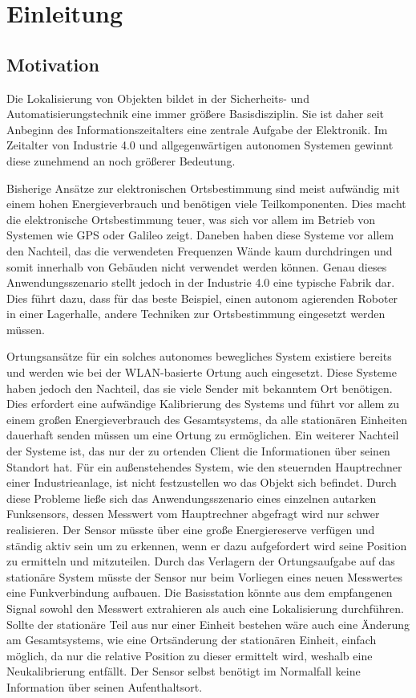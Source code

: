 
\chapter{Einleitung}
\label{sec:Einleitung}
\pagestyle{scrheadings}



\section{Motivation}
Die Lokalisierung von Objekten bildet in der Sicherheits- und Automatisierungstechnik eine immer größere Basisdisziplin. Sie ist daher seit Anbeginn des Informationszeitalters eine zentrale Aufgabe der Elektronik. Im Zeitalter von Industrie 4.0 und allgegenwärtigen autonomen Systemen gewinnt diese zunehmend an noch größerer Bedeutung. 

Bisherige Ansätze zur elektronischen Ortsbestimmung sind meist aufwändig mit einem hohen Energieverbrauch und benötigen viele Teilkomponenten. Dies macht die elektronische Ortsbestimmung teuer, was sich vor allem im Betrieb von Systemen wie GPS oder Galileo zeigt. Daneben haben diese Systeme vor allem den Nachteil, das die verwendeten Frequenzen Wände kaum durchdringen und somit innerhalb von Gebäuden nicht verwendet werden können. Genau dieses Anwendungsszenario stellt jedoch in der Industrie 4.0 eine typische Fabrik dar. Dies führt dazu, dass für das beste Beispiel, einen autonom agierenden Roboter in einer Lagerhalle, andere Techniken zur Ortsbestimmung eingesetzt werden müssen. 

Ortungsansätze für ein solches autonomes bewegliches System existiere bereits und werden wie bei der WLAN-basierte Ortung auch eingesetzt. Diese Systeme haben jedoch den Nachteil, das sie viele Sender mit bekanntem Ort benötigen. Dies erfordert eine aufwändige Kalibrierung des Systems und führt vor allem zu einem großen Energieverbrauch des Gesamtsystems, da alle stationären Einheiten dauerhaft senden müssen um eine Ortung zu ermöglichen.
Ein weiterer Nachteil der Systeme ist, das nur der zu ortenden Client die Informationen über seinen Standort hat. Für ein außenstehendes System, wie den steuernden Hauptrechner einer Industrieanlage, ist nicht festzustellen wo das Objekt sich befindet. %
Durch diese Probleme ließe sich das Anwendungsszenario eines einzelnen autarken Funksensors, dessen Messwert vom Hauptrechner abgefragt wird nur schwer realisieren. Der Sensor müsste über eine große Energiereserve verfügen und ständig aktiv sein um zu erkennen, wenn er dazu aufgefordert wird seine Position zu ermitteln und mitzuteilen.
Durch das Verlagern der Ortungsaufgabe auf das stationäre System müsste der Sensor nur beim Vorliegen eines neuen Messwertes eine Funkverbindung aufbauen. Die Basisstation könnte aus dem empfangenen Signal sowohl den Messwert extrahieren als auch eine Lokalisierung durchführen.
Sollte der stationäre Teil  aus nur einer Einheit bestehen wäre auch eine Änderung am Gesamtsystems, wie eine Ortsänderung der stationären Einheit, einfach möglich, da nur die relative Position zu dieser ermittelt wird, weshalb eine Neukalibrierung entfällt. Der Sensor selbst benötigt im Normalfall keine Information über seinen Aufenthaltsort. 


